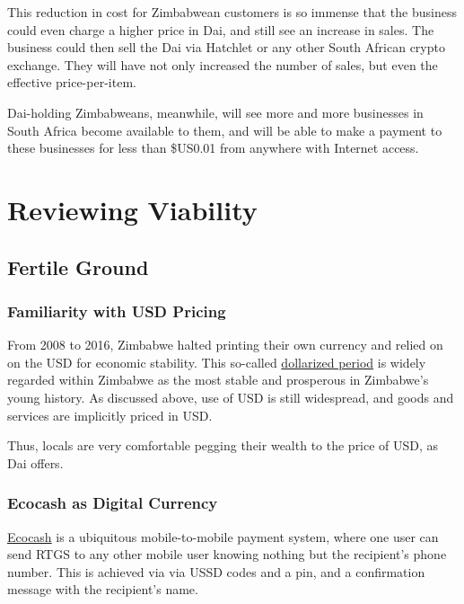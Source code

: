\documentclass{article}
\begin{document}
This reduction in cost for Zimbabwean customers is so immense that the business could even charge a higher price in Dai, and still see an increase in sales. The business could then sell the Dai via Hatchlet or any other South African crypto exchange. They will have not only increased the number of sales, but even the effective price-per-item.

Dai-holding Zimbabweans, meanwhile, will see more and more businesses in South Africa become available to them, and will be able to make a payment to these businesses for less than \$US0.01 from anywhere with Internet access.

\newpage
\section{Reviewing Viability} \label{viability}

\subsection{Fertile Ground} \label{fertile}

\subsubsection{Familiarity with USD Pricing} \label{familiar with usd}

From 2008 to 2016, Zimbabwe halted printing their own currency and relied on on the USD for economic stability. This so-called \href{https://www.voanews.com/africa/zimbabwe-ends-decade-dollarization-new-currency-reform}{dollarized period} is widely regarded within Zimbabwe as the most stable and prosperous in Zimbabwe's young history. As discussed above, use of USD is still widespread, and goods and services are implicitly priced in USD.

Thus, locals are very comfortable pegging their wealth to the price of USD, as Dai offers.

\subsubsection{Ecocash as Digital Currency} \label{ecocash digital}

\href{https://en.wikipedia.org/wiki/EcoCash}{Ecocash} is a ubiquitous mobile-to-mobile payment system, where one user can send RTGS to any other mobile user knowing nothing but the recipient's phone number. This is achieved via via USSD codes and a pin, and a confirmation message with the recipient's name.
\end{document}
